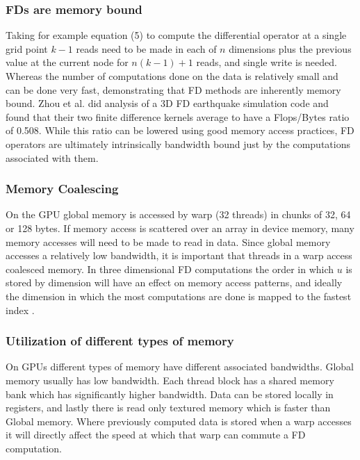 \documentclass[conference]{IEEEtran}
\begin{document}
\subsubsection{FDs are memory bound}
Taking for example equation (5) to compute the differential operator at a single grid point $k-1$ reads need to be made in each of $n$ dimensions plus the previous value at the current node for $n(k-1) + 1$ reads, and single write is needed. Whereas the number of computations done on the data is relatively small and can be done very fast, demonstrating that FD methods are inherently memory bound. Zhou et al.\cite{Zhou1} did analysis of a 3D FD earthquake simulation code and found that their two finite difference kernels average to have a Flops/Bytes ratio of 0.508. While this ratio can be lowered using good memory access practices, FD operators are ultimately intrinsically bandwidth bound just by the computations associated with them.

\subsubsection{Memory Coalescing}

On the GPU global memory is accessed by warp (32 threads) in chunks of 32, 64 or 128 bytes. If memory access is scattered over an array in device memory, many memory accesses will need to be made to read in data. Since global memory accesses a relatively low bandwidth, it is important that threads in a warp access coalesced memory. In three dimensional FD computations the order in which $u$ is stored by dimension will have an effect on memory access patterns, and ideally the dimension in which the most computations are done is mapped to the fastest index \cite{Harris}.

\subsubsection{Utilization of different types of memory}

On GPUs different types of memory have different associated bandwidths. Global memory usually has low bandwidth. Each thread block has a shared memory bank which has significantly higher bandwidth. Data can be stored locally in registers, and lastly there is read only textured memory which is faster than Global memory. Where previously computed data is stored when a warp accesses it will directly affect the speed at which that warp can commute a FD computation\cite{Harris}.
\end{document}
